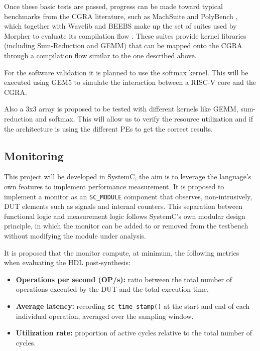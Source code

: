 \documentclass[conference]{IEEEtran}
\begin{document}
Once these basic tests are passed, progress can be made toward typical benchmarks from the CGRA literature, such as MachSuite and PolyBench \cite{PolyBenchC,MachSuite}, which together with Wavelib and BEEBS make up the set of suites used by Morpher to evaluate its compilation flow \cite{Juneja}. 
These suites provide kernel libraries (including Sum-Reduction and GEMM) that can be mapped onto the CGRA through a compilation flow similar to the one described above.

For the software validation it is planned to use the softmax kernel. 
This will be executed using GEM5 to simulate the interaction between a RISC-V core and the CGRA. 

Also a 3x3 array is proposed to be tested with different kernels like GEMM, sum-reduction and softmax. 
This will allow us to verify the resource utilization and if the architecture is using the different PEs to get the correct results.

\subsection{Monitoring}

This project will be developed in SystemC, the aim is to leverage the language's own features to implement performance measurement. 
It is proposed to implement a monitor as an \texttt{SC\_MODULE} component that observes, non-intrusively, DUT elements such as signals and internal counters. 
This separation between functional logic and measurement logic follows SystemC's own modular design principle, in which the monitor can be added to or removed from the testbench without modifying the module under analysis.

It is proposed that the monitor compute, at minimum, the following metrics when evaluating the HDL post-synthesis:

\begin{itemize}
    \item \textbf{Operations per second (OP/s):} ratio between the total number of operations executed by the DUT and the total execution time.
    \item \textbf{Average latency:} recording \texttt{sc\_time\_stamp()} at the start and end of each individual operation, averaged over the sampling window.
    \item \textbf{Utilization rate:} proportion of active cycles relative to the total number of cycles.
\end{itemize}
\end{document}
